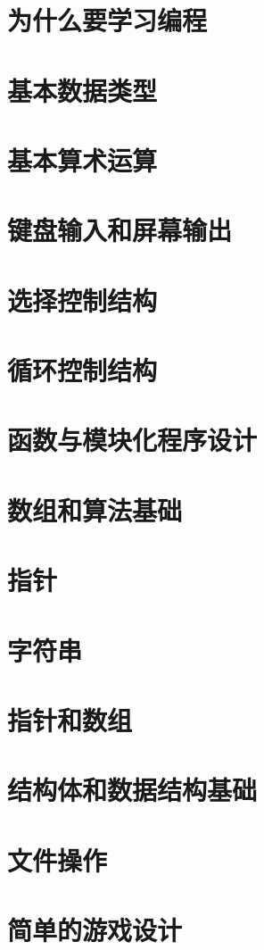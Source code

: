 \documentclass[11pt,a4paper,oneside,openany]{book}
\begin{document}

\tableofcontents
\clearpage

\chapter{为什么要学习编程}


\chapter{基本数据类型}


\chapter{基本算术运算}


\chapter{键盘输入和屏幕输出}


\chapter{选择控制结构}


\chapter{循环控制结构}


\chapter{函数与模块化程序设计}


\chapter{数组和算法基础}


\chapter{指针}


\chapter{字符串}


\chapter{指针和数组}


\chapter{结构体和数据结构基础}


\chapter{文件操作}


\chapter{简单的游戏设计}

\end{document}
